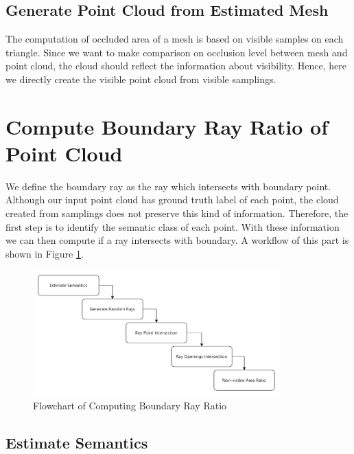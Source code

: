 \documentclass[11pt, a4paper,oneside,chapterprefix=false]{scrbook}
\begin{document}
\subsection{Generate Point Cloud from Estimated Mesh} \label{par:generate point cloud from estimated mesh}

The computation of occluded area of a mesh is based on visible samples on each triangle. Since we want to make comparison on occlusion level between mesh and point cloud, the cloud should reflect the information about visibility. Hence, here we directly create the visible point cloud from visible samplings.

\section{Compute Boundary Ray Ratio of Point Cloud} \label{compute boundary ray ratio of point cloud} 

We define the boundary ray as the ray which intersects with boundary point. Although our input point cloud has ground truth label of each point, the cloud created from samplings does not preserve this kind of information. Therefore, the first step is to identify the semantic class of each point. With these information we can then compute if a ray intersects with boundary. A workflow of this part is shown in Figure \ref{fig:flowchart of computing boundary ray ratio}.

\begin{figure}[H]
    \centering
    \includegraphics*[width=0.85\textwidth]{figures/Compute Boundary Ray Ratio of Point Cloud.png}
    \caption{Flowchart of Computing Boundary Ray Ratio}
    \label{fig:flowchart of computing boundary ray ratio}
\end{figure}

\subsection{Estimate Semantics}
\end{document}
